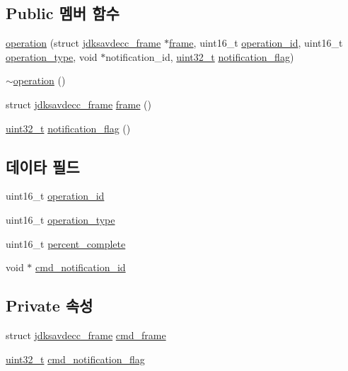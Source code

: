 \subsection*{Public 멤버 함수}
\begin{DoxyCompactItemize}
\item 
\hyperlink{classavdecc__lib_1_1operation_a1b87f4de34e161817603f3bae470daa7}{operation} (struct \hyperlink{structjdksavdecc__frame}{jdksavdecc\+\_\+frame} $\ast$\hyperlink{classavdecc__lib_1_1operation_a036cb8d3d1c24cd0f34f101b44a8cb92}{frame}, uint16\+\_\+t \hyperlink{classavdecc__lib_1_1operation_a5b1b19c38a3b340cfc6ebcb9eeb153e2}{operation\+\_\+id}, uint16\+\_\+t \hyperlink{classavdecc__lib_1_1operation_ab2dfcd06646c4907feb4ec8153ba7b79}{operation\+\_\+type}, void $\ast$notification\+\_\+id, \hyperlink{parse_8c_a6eb1e68cc391dd753bc8ce896dbb8315}{uint32\+\_\+t} \hyperlink{classavdecc__lib_1_1operation_a6d92b4faaea5e92909388eade16c7dcd}{notification\+\_\+flag})
\item 
\hyperlink{classavdecc__lib_1_1operation_a60f72d333ff72faa795b8653debd149a}{$\sim$operation} ()
\item 
struct \hyperlink{structjdksavdecc__frame}{jdksavdecc\+\_\+frame} \hyperlink{classavdecc__lib_1_1operation_a036cb8d3d1c24cd0f34f101b44a8cb92}{frame} ()
\item 
\hyperlink{parse_8c_a6eb1e68cc391dd753bc8ce896dbb8315}{uint32\+\_\+t} \hyperlink{classavdecc__lib_1_1operation_a6d92b4faaea5e92909388eade16c7dcd}{notification\+\_\+flag} ()
\end{DoxyCompactItemize}
\subsection*{데이타 필드}
\begin{DoxyCompactItemize}
\item 
uint16\+\_\+t \hyperlink{classavdecc__lib_1_1operation_a5b1b19c38a3b340cfc6ebcb9eeb153e2}{operation\+\_\+id}
\item 
uint16\+\_\+t \hyperlink{classavdecc__lib_1_1operation_ab2dfcd06646c4907feb4ec8153ba7b79}{operation\+\_\+type}
\item 
uint16\+\_\+t \hyperlink{classavdecc__lib_1_1operation_aecd19b49efe60de843635a9ab3ac6dd7}{percent\+\_\+complete}
\item 
void $\ast$ \hyperlink{classavdecc__lib_1_1operation_ae12ae96f6a6a0968d009df862ac491ab}{cmd\+\_\+notification\+\_\+id}
\end{DoxyCompactItemize}
\subsection*{Private 속성}
\begin{DoxyCompactItemize}
\item 
struct \hyperlink{structjdksavdecc__frame}{jdksavdecc\+\_\+frame} \hyperlink{classavdecc__lib_1_1operation_a88a6b7b79f4e053abd5803938d5fb6ee}{cmd\+\_\+frame}
\item 
\hyperlink{parse_8c_a6eb1e68cc391dd753bc8ce896dbb8315}{uint32\+\_\+t} \hyperlink{classavdecc__lib_1_1operation_a6dadf217e8508c79699a9c18121f9217}{cmd\+\_\+notification\+\_\+flag}
\end{DoxyCompactItemize}


